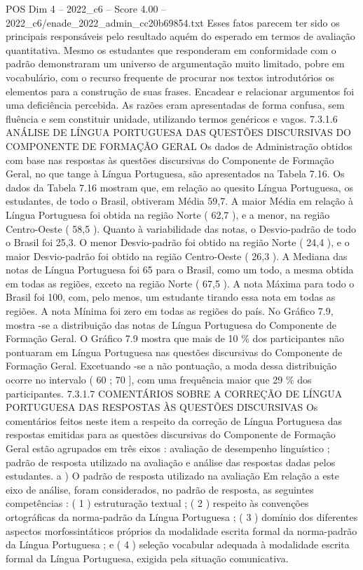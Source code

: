 \begin{textsample}{POS Dim 4 – 2022\_c6 – Score 4.00 – 2022\_c6/enade\_2022\_admin\_cc20b69854.txt}
Esses fatos parecem ter sido os principais responsáveis pelo resultado aquém do esperado em termos de avaliação quantitativa.
Mesmo os estudantes que responderam em conformidade com o padrão demonstraram um universo de argumentação muito limitado, pobre em vocabulário, com o recurso frequente de procurar nos textos introdutórios os elementos para a construção de suas frases.
Encadear e relacionar argumentos foi uma deficiência percebida.
As razões eram apresentadas de forma confusa, sem fluência e sem constituir unidade, utilizando termos genéricos e vagos. 7.3.1.6 ANÁLISE DE LÍNGUA PORTUGUESA DAS QUESTÕES DISCURSIVAS DO COMPONENTE DE FORMAÇÃO GERAL Os dados de Administração obtidos com base nas respostas às questões discursivas do Componente de Formação Geral, no que tange à Língua Portuguesa, são apresentados na Tabela 7.16.
Os dados da Tabela 7.16 mostram que, em relação ao quesito Língua Portuguesa, os estudantes, de todo o Brasil, obtiveram Média 59,7.
A maior Média em relação à Língua Portuguesa foi obtida na região Norte ( 62,7 ), e a menor, na região Centro-Oeste ( 58,5 ).
Quanto à variabilidade das notas, o Desvio-padrão de todo o Brasil foi 25,3.
O menor Desvio-padrão foi obtido na região Norte ( 24,4 ), e o maior Desvio-padrão foi obtido na região Centro-Oeste ( 26,3 ).
A Mediana das notas de Língua Portuguesa foi 65 para o Brasil, como um todo, a mesma obtida em todas as regiões, exceto na região Norte ( 67,5 ).
A nota Máxima para todo o Brasil foi 100, com, pelo menos, um estudante tirando essa nota em todas as regiões.
A nota Mínima foi zero em todas as regiões do país.
No Gráfico 7.9, mostra -se a distribuição das notas de Língua Portuguesa do Componente de Formação Geral.
O Gráfico 7.9 mostra que mais de 10 \% dos participantes não pontuaram em Língua Portuguesa nas questões discursivas do Componente de Formação Geral.
Excetuando -se a não pontuação, a moda dessa distribuição ocorre no intervalo ( 60 ; 70 ], com uma frequência maior que 29 \% dos participantes. 7.3.1.7 COMENTÁRIOS SOBRE A CORREÇÃO DE LÍNGUA PORTUGUESA DAS RESPOSTAS ÀS QUESTÕES DISCURSIVAS Os comentários feitos neste item a respeito da correção de Língua Portuguesa das respostas emitidas para as questões discursivas do Componente de Formação Geral estão agrupados em três eixos : avaliação de desempenho linguístico ; padrão de resposta utilizado na avaliação e análise das respostas dadas pelos estudantes. a ) O padrão de resposta utilizado na avaliação Em relação a este eixo de análise, foram considerados, no padrão de resposta, as seguintes competências : ( 1 ) estruturação textual ; ( 2 ) respeito às convenções ortográficas da norma-padrão da Língua Portuguesa ; ( 3 ) domínio dos diferentes aspectos morfossintáticos próprios da modalidade escrita formal da norma-padrão da Língua Portuguesa ; e ( 4 ) seleção vocabular adequada à modalidade escrita formal da Língua Portuguesa, exigida pela situação comunicativa.

\end{textsample}
